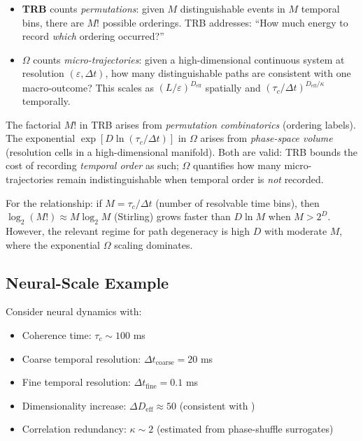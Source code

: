 \documentclass[12pt]{article}
\numberwithin{equation}{section}
\begin{document}
\begin{itemize}
\item \textbf{TRB} counts \emph{permutations}: given $M$ distinguishable events in $M$ temporal bins, there are $M!$ possible orderings. TRB addresses: ``How much energy to record \emph{which} ordering occurred?''

\item \textbf{$\Omega$} counts \emph{micro-trajectories}: given a high-dimensional continuous system at resolution $(\varepsilon, \Delta t)$, how many distinguishable paths are consistent with one macro-outcome? This scales as $(L/\varepsilon)^{D_{\mathrm{eff}}}$ spatially and $(\tau_c/\Delta t)^{D_{\mathrm{eff}}/\kappa}$ temporally.
\end{itemize}

The factorial $M!$ in TRB arises from \emph{permutation combinatorics} (ordering labels). The exponential $\exp[D \ln(\tau_c/\Delta t)]$ in $\Omega$ arises from \emph{phase-space volume} (resolution cells in a high-dimensional manifold). Both are valid: TRB bounds the cost of recording \emph{temporal order} as such; $\Omega$ quantifies how many micro-trajectories remain indistinguishable when temporal order is \emph{not} recorded.

For the relationship: if $M = \tau_c/\Delta t$ (number of resolvable time bins), then $\log_2(M!) \approx M\log_2 M$ (Stirling) grows faster than $D\ln M$ when $M > 2^D$. However, the relevant regime for path degeneracy is high $D$ with moderate $M$, where the exponential $\Omega$ scaling dominates.

\subsection{Neural-Scale Example}

Consider neural dynamics with:
\begin{itemize}
\item Coherence time: $\tau_c \sim 100$ ms
\item Coarse temporal resolution: $\Delta t_{\text{coarse}} = 20$ ms
\item Fine temporal resolution: $\Delta t_{\text{fine}} = 0.1$ ms
\item Dimensionality increase: $\Delta D_{\text{eff}} \approx 50$ (consistent with \cite{stringer2019})
\item Correlation redundancy: $\kappa \sim 2$ (estimated from phase-shuffle surrogates)
\end{itemize}
\end{document}
